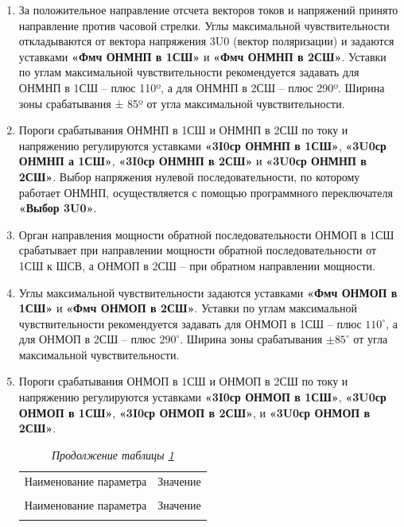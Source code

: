 \begin{enumerate}[label=\arabic{section}.\arabic{subsection}.\arabic*,  align=left, labelsep=4pt, leftmargin=0pt, itemindent=57pt]
\item
За положительное направление отсчета векторов токов и напряжений принято направление против
часовой стрелки. Углы максимальной чувствительности откладываются от вектора напряжения 3U0 (вектор
поляризации) и задаются уставками \textbf{«Фмч ОНМНП в 1СШ»} и \textbf{«Фмч ОНМНП в 2СШ»}. Уставки по углам
максимальной чувствительности рекомендуется задавать для ОНМНП в 1СШ – плюс 110º, а для ОНМНП в
2СШ – плюс 290º. Ширина зоны срабатывания ± 85º от угла максимальной чувствительности.

\item
Пороги срабатывания ОНМНП в 1СШ и ОНМНП в 2СШ по току и напряжению регулируются уставками 
\textbf{«3I0ср ОНМНП в 1СШ»}, \textbf{«3U0ср ОНМНП а 1СШ»}, \textbf{«3I0ср ОНМНП в 2СШ»} и \textbf{«3U0ср ОНМНП в 2СШ»}. Выбор
напряжения нулевой последовательности, по которому работает ОНМНП, осуществляется с помощью
программного переключателя \textbf{«Выбор 3U0»}. 

\item
Орган направления мощности обратной последовательности ОНМОП в 1СШ срабатывает при
направлении мощности обратной последовательности от 1СШ к ШСВ, а ОНМОП в 2СШ -- при обратном
направлении мощности. 

\item
Углы максимальной чувствительности задаются уставками \textbf{«Фмч ОНМОП в 1СШ»} и \textbf{«Фмч ОНМОП в
2СШ»}. Уставки по углам максимальной чувствительности рекомендуется задавать для ОНМОП в 1СШ -- плюс
$110^\circ$, а для ОНМОП в 2СШ -- плюс $290^\circ$. Ширина зоны срабатывания $\pm 85^\circ$ от угла максимальной
чувствительности.

\item
Пороги срабатывания ОНМОП в 1СШ и ОНМОП в 2СШ  по току и напряжению регулируются уставками
\textbf{«3I0ср ОНМОП в 1СШ»}, \textbf{«3U0ср ОНМОП в 1СШ»}, \textbf{«3I0ср ОНМОП в 2СШ»}, и \textbf{«3U0ср ОНМОП в 2СШ»}.

\small
\setlength{\extrarowheight}{0.05cm} %
\begin{longtable}
{|>{\centering\arraybackslash}m{15.2cm}|>{\centering\arraybackslash}m{1.7cm}|}
\caption{Параметры ОНМНП(ОНМОП)\hfill\vspace{-0.5\baselineskip}}\label{tnznp:tbl1}\\ 
\hhline{|-|-|}
\rowcolor{gray!30}
Наименование параметра & Значение  \\ 
\hhline{|-|-|}
\endfirsthead

\caption*{\hspace{3pt}\emph{Продолжение таблицы \ref{tnznp:tbl1}\hfill\vspace{-0.5\baselineskip}}} \\
\hhline{|-|-|}
\rowcolor{gray!30}
Наименование параметра & Значение  \\ 
\hhline{|-|-|}
\endhead
\hhline{|-|-|}


\end{longtable}
\end{enumerate}
